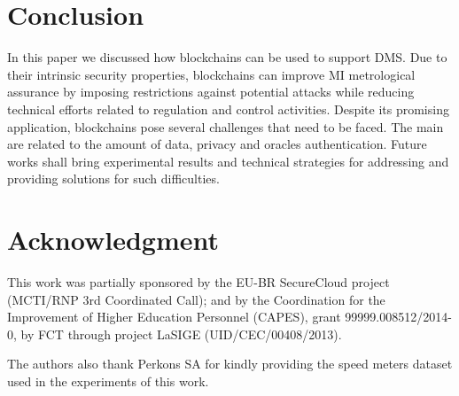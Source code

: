 \documentclass[journal]{IEEEtran}
\begin{document}
\section{Conclusion}
In this paper we discussed how blockchains can be used to support DMS. Due to their intrinsic security properties, blockchains can improve MI metrological assurance by imposing restrictions against potential attacks while reducing technical efforts related to regulation and control activities. Despite its promising application, blockchains pose several challenges that need to be faced. The main are related to the amount of data, privacy and oracles authentication. Future works shall bring experimental results and technical strategies for addressing and providing solutions for such difficulties.


\section*{Acknowledgment}
This work was partially sponsored by the EU-BR SecureCloud project (MCTI/RNP 3rd Coordinated Call); and by the Coordination for the Improvement of Higher Education Personnel (CAPES), grant 99999.008512/2014-0, by FCT through project LaSIGE (UID/CEC/00408/2013).

The authors also thank Perkons SA for kindly providing the speed meters dataset used in the experiments of this work.
\end{document}
